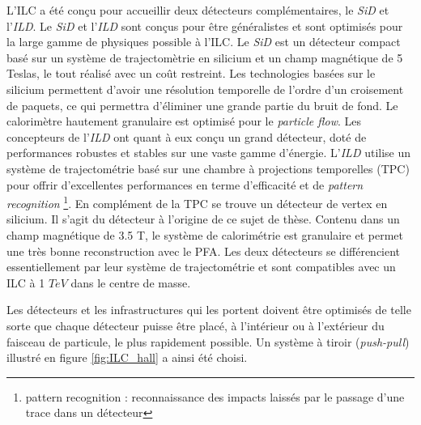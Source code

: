   L'ILC a \'et\'e con\c{c}u pour accueillir deux d\'etecteurs compl\'ementaires, le \textit{SiD} et l'\textit{ILD}. Le \textit{SiD} et l'\textit{ILD} sont con\c{c}us pour \^etre g\'en\'eralistes et sont optimis\'es pour la large gamme de physiques possible \`a l'ILC. Le \textit{SiD} est un d\'etecteur compact bas\'e sur un syst\`eme de trajectom\`etrie en silicium et un champ magn\'etique de 5 Teslas, le tout r\'ealis\'e avec un co\^ut restreint. Les technologies bas\'ees sur le silicium permettent d'avoir une r\'esolution temporelle de l'ordre d'un croisement de paquets, ce qui permettra d'\'eliminer une grande partie du bruit de fond. Le calorim\`etre hautement granulaire est optimis\'e pour le \textit{particle flow}. Les concepteurs de l'\textit{ILD} ont quant \`a eux con\c{c}u un grand d\'etecteur, dot\'e de performances robustes et stables sur une vaste gamme d'\'energie. L'\textit{ILD} utilise un syst\`eme de trajectom\'etrie bas\'e sur une chambre \`a projections temporelles (TPC) pour offrir d'excellentes performances en terme d'efficacit\'e et de \textit{pattern recognition} \footnote{pattern recognition : reconnaissance des impacts laiss\'es par le passage d'une trace dans un d\'etecteur}. En compl\'ement de la TPC se trouve un d\'etecteur de vertex en silicium. Il s'agit du d\'etecteur \`a l'origine de ce sujet de th\`ese. Contenu dans un champ magn\'etique de 3.5 T, le syst\`eme de calorim\'etrie est granulaire et permet une tr\`es bonne reconstruction avec le PFA. Les deux d\'etecteurs se diff\'erencient essentiellement par leur syst\`eme de trajectom\'etrie et sont compatibles avec un ILC \`a 1 $TeV$ dans le centre de masse.
  
  \medskip
  
  
  \medskip
  
  Les d\'etecteurs et les infrastructures qui les portent doivent \^etre optimis\'es de telle sorte que chaque d\'etecteur puisse être plac\'e, \`a l'intérieur ou \`a l'extérieur du faisceau de particule, le plus rapidement possible. Un syst\`eme \`a tiroir (\textit{push-pull}) illustr\'e en figure \ref{fig:ILC_hall} a ainsi \'et\'e choisi. 
  
